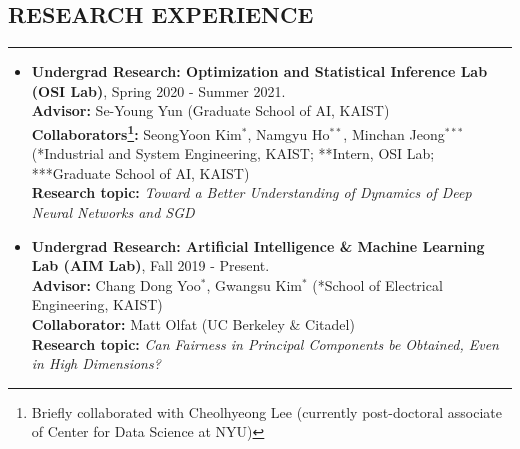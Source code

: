 \documentclass[10pt,a4]{article}
\begin{document}
\begin{small}
\pagestyle{fancy}
\lhead{\textcolor{gray}{\it Junghyun Lee}}
\fancyfoot[C]{}



\subsection*{RESEARCH EXPERIENCE}
\hrule
\vspace{0.2cm}
\begin{itemize}
	
 \item 
 	{\bf Undergrad Research: Optimization and Statistical Inference Lab (OSI Lab)}, Spring 2020 - Summer 2021. \\
 {\bf Advisor:} Se-Young Yun (Graduate School of AI, KAIST) \\
 {\bf Collaborators\footnote{Briefly collaborated with Cheolhyeong Lee (currently post-doctoral associate of Center for Data Science at NYU)}:} SeongYoon Kim$^{*}$, Namgyu Ho$^{**}$, Minchan Jeong$^{***}$ (*Industrial and System Engineering, KAIST; **Intern, OSI Lab; ***Graduate School of AI, KAIST) \\
 {\bf Research topic:} {\it Toward a Better Understanding of Dynamics of Deep Neural Networks and SGD } \\


 \item {\bf Undergrad Research:
  Artificial Intelligence \& Machine Learning Lab (AIM Lab)}, Fall 2019 - Present. \\
 {\bf Advisor:} Chang Dong Yoo$^{*}$, Gwangsu Kim$^{*}$ (*School of Electrical Engineering, KAIST) \\
 {\bf Collaborator:} Matt Olfat (UC Berkeley \& Citadel) \\
 {\bf Research topic:} {\it Can Fairness in Principal Components be Obtained, Even in High Dimensions?} \\


\end{itemize}
\end{small}
\end{document}
